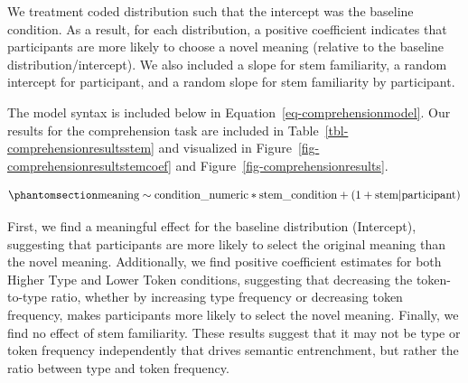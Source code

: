 \documentclass[
  letterpaper,
  DIV=11,
  numbers=noendperiod]{scrartcl}
\begin{document}
We treatment coded distribution such that the intercept was the baseline
condition. As a result, for each distribution, a positive coefficient
indicates that participants are more likely to choose a novel meaning
(relative to the baseline distribution/intercept). We also included a
slope for stem familiarity, a random intercept for participant, and a
random slope for stem familiarity by participant.

The model syntax is included below in
Equation~\ref{eq-comprehensionmodel}. Our results for the comprehension
task are included in Table~\ref{tbl-comprehensionresultsstem} and
visualized in Figure~\ref{fig-comprehensionresultstemcoef} and
Figure~\ref{fig-comprehensionresults}.

\begin{equation}\phantomsection\label{eq-comprehensionmodel}{
\text{meaning} \sim \text{condition\_numeric} * \text{stem\_condition} + (1 + \text{stem} | \text{participant})
}\end{equation}

First, we find a meaningful effect for the baseline distribution
(Intercept), suggesting that participants are more likely to select the
original meaning than the novel meaning. Additionally, we find positive
coefficient estimates for both Higher Type and Lower Token conditions,
suggesting that decreasing the token-to-type ratio, whether by
increasing type frequency or decreasing token frequency, makes
participants more likely to select the novel meaning. Finally, we find
no effect of stem familiarity. These results suggest that it may not be
type or token frequency independently that drives semantic entrenchment,
but rather the ratio between type and token frequency.
\end{document}
